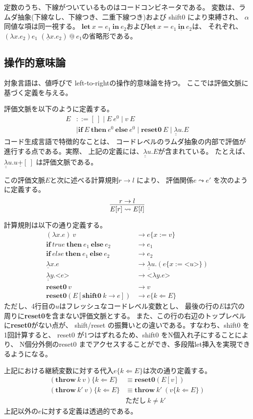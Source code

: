 \documentclass[T]{compsoft}
\makeatletter
\newcommand\fun[2]{\lambda{#1}.{#2}}
\newcommand\Resetz{\textbf{reset0}}
\newcommand\Shiftz{\textbf{shift0}}
\newcommand\Throw{\textbf{throw}}
\newcommand\throw[2]{\Throw~{#1}~{#2}}
\newcommand\cfun[2]{\underline{\lambda}{#1}.{#2}}
\newcommand\ccfun[2]{\underline{\underline{\lambda}}{#1}.{#2}}
\newcommand\cPlus{\underline{\textbf{+}}}
\newcommand\cLet{\underline{\textbf{let}}}
\newcommand\cIn{\underline{\textbf{in}}}
\newcommand\clet[3]{\cLet~{#1}={#2}~\cIn~{#3}}
\newcommand\code[1]{\texttt{<}{#1}\texttt{>}}
\newcommand\Let{\textbf{let}}
\newcommand\In{\textbf{in}}
\newcommand\letin[3]{\Let~{#1}={#2}~\In~{#3}}
\newcommand\ift[3]{\textbf{if}~{#1}~\textbf{then}~{#2}~\textbf{else}~{#3}}
\newcommand\lto{\leadsto}
\newcommand\cat{~\underline{@}~}
\newcommand\ksubst[2]{\{{#1}\Leftarrow{#2}\}}
\theoremstyle{break}
\makeatother
\begin{document}
定数のうち、下線がついているものはコードコンビネータである。
変数は、ラムダ抽象(下線なし、下線つき、二重下線つき)および shift0 により束縛され、
$\alpha$同値な項は同一視する。
$\letin{x}{e_1}{e_2}$および$\clet{x}{e_1}{e_2}$は、
それぞれ、$(\fun{x}{e_2})e_1$
$(\cfun{x}{e_2})\cat e_1$の省略形である。

\subsection{操作的意味論}

対象言語は、値呼びで left-to-rightの操作的意味論を持つ。
ここでは評価文脈に基づく定義を与える。

評価文脈を以下のように定義する。
\begin{align*}
  E & ::= [~] \mid E~ e^0 \mid v~ E \\
    & \mid \ift{E}{e^0}{e^0} \mid \Resetz~ E \mid \ccfun{u}{E}
\end{align*}
コード生成言語で特徴的なことは、
コードレベルのラムダ抽象の内部で評価が進行する点である。実際、
上記の定義には、$\ccfun{u}{E}$が含まれている。
たとえば、$\ccfun{u}{u \cPlus [~]}$ は評価文脈である。

この評価文脈$E$と次に述べる計算規則$r \to l$ により、
評価関係$e \lto e'$ を次のように定義する。
\[
  \infer{E[r] \lto E[l]}{r \to l}
\]

計算規則は以下の通り定義する。
\begin{align*}
  (\fun{x}{e})~v &\to e\{ x := v \} \\
  \ift{true}{e_1}{e_2} &\to e_1 \\
  \ift{else}{e_1}{e_2} &\to e_2 \\
  \cfun{x}{e} &\to \ccfun{u}{(e\{ x := \code{u} \})} \\
  \ccfun{y}{\code{e}} &\to \code{\fun{y}{e}} \\
  \Resetz~ v &\to v \\
  \Resetz (E[\Shiftz~ k \to e]) &\to e \ksubst{k}{E}
\end{align*}
ただし、4行目の$u$はフレッシュなコードレベル変数とし、
最後の行の$E$は穴の周りに{\Resetz}を含まない評価文脈とする。
また、この行の右辺のトップレベルに{\Resetz}がない点が、
shift/reset の振舞いとの違いである。すなわち、shift0 を1回計算すると、
reset0 が1つはずれるため、shift0 をN個入れ子にすることにより、
N個分外側のreset0 までアクセスすることができ、多段階let挿入を実現でき
るようになる。

上記における継続変数に対する代入$e\ksubst{k}{E}$は次の通り定義する。
\begin{align*}
  (\throw{k}{v})\ksubst{k}{E} &\equiv \Resetz (E[v]) \\
  (\throw{k'}{v})\ksubst{k}{E} &\equiv \throw{k'}{(v\ksubst{k}{E})} 
\\
& \text{ただし}~k \not= k'
\end{align*}
上記以外の$e$に対する定義は透過的である。
\end{document}
